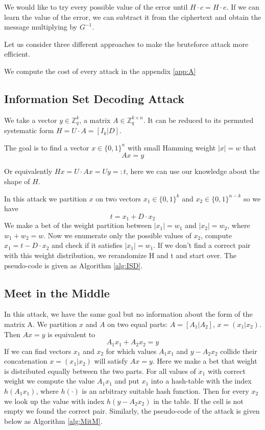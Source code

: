 \documentclass[12pt]{article}
\newcommand{\ZZ}{\mathbb{Z}}
\begin{document}
We would like to try every possible value of the error until $H \cdot c = H \cdot e$. If we can learn the value of the error, we can subtract it from the ciphertext and obtain the message multiplying by $G^{-1}$.

Let us consider three different approaches to make the bruteforce attack more efficient.

We compute the cost of every attack in the appendix \ref{app:A}


\subsection{Information Set Decoding Attack}

We take a vector $y \in \ZZ_q^{k}$, a matrix $A \in \ZZ_q^{k \times n}$. It can be reduced to its permuted systematic form $H  = U \cdot A = [I_{k}|D]$.


The goal is to find a vector $x \in \{0,1\}^{n}$ with small Hamming weight $|x| = w$ that
\[
Ax = y
\]

Or equivalently $Hx = U\cdot Ax = Uy =: t$, here we can use our knowledge about the shape of $H$.

In this attack we partition $x$ on two vectors $x_1 \in \{0,1\}^{k}$ and  $x_2  \in \{0,1\}^{n-k}$ so we have
\[
t = x_1 + D \cdot x_2
\]
We make a bet of the weight partition between $|x_1| = w_1$ and $|x_2| = w_2$, where $w_1 + w_2 = w$. Now we enumerate only the possible values of $x_2$, compute $x_1 = t - D \cdot x_2$ and check if it satisfies $|x_1| = w_1$. If we don't find a correct pair with this weight distribution, we rerandomize H and t and start over. The pseudo-code is given as Algorithm \ref{alg:ISD}.

\subsection{Meet in the Middle}
In this attack, we have the same goal but no information about the form of the matrix A.
We partition $x$ and $A$ on two equal parts: $A = [A_1 | A_2]$, $x = (x_1 | x_2)$.
Then $Ax = y$ is equivalent to
\[
    A_1x_1 + A_2x_2 = y
\]
If we can find vectors $x_1$ and $x_2$ for which values $A_1x_1$ and $y - A_2x_2$ collide their concatenation $x = (x_1 |x_2)$ will satisfy $Ax = y$. Here we make a bet that weight is distributed equally between the two parts. For all values of $x_1$ with correct weight we compute the value $A_1x_1$ and put $x_1$ into a hash-table with the index $h(A_1x_1)$, where $h(\cdot)$ is an arbitrary suitable hash function. Then for every $x_2$ we look up the value with index $h(y - A_2x_2)$ in the table. If the cell is not empty we found the correct pair. Similarly, the pseudo-code of the attack is given below as Algorithm \ref{alg:MitM}.
\end{document}
